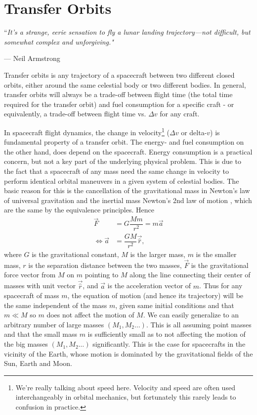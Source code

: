 \chapter{Transfer Orbits} \label{ch:transfer orbits}
\epigraph{``\itshape{It's a strange, eerie sensation to fly a lunar landing trajectory—not difficult, but somewhat complex and unforgiving.}"}{--- \textup{Neil Armstrong}}
Transfer orbits is any trajectory of a spacecraft between two different closed orbits, either around the same celestial body or two different bodies. In general, transfer orbits will always be a trade-off between flight time (the total time required for the transfer orbit) and fuel consumption for a specific craft - or equivalently, a trade-off between flight time vs. $\Delta v$ for any craft.

In spacecraft flight dynamics, the change in velocity\footnote{We're really talking about speed here. Velocity and speed are often used interchangeably in orbital mechanics, but fortunately this rarely leads to confusion in practice.} ($\Delta v$ or delta-$v$) is fundamental property of a transfer orbit. The energy- and fuel consumption on the other hand, does depend on the spacecraft. Energy consumption is a practical concern, but not a key part of the underlying physical problem. This is due to the fact that a spacecraft of any mass need the same change in velocity to perform identical orbital maneuvers in a given system of celestial bodies. The basic reason for this is the cancellation of the gravitational mass in Newton's law of universal gravitation and the inertial mass Newton's 2nd law of motion \cite{Knudsen2002}, which are the same by the equivalence principles. Hence
\begin{align}
\vec{F} &= G \dfrac{M m}{r^2} = m \vec{a} \\[0.3cm]
\Leftrightarrow \vec{a} &= \dfrac{G M}{r^2} \vec{\hat{r}} \label{eq:general-eom},
\end{align}
where $G$ is the gravitational constant, $M$ is the larger mass, $m$ is the smaller mass, $r$ is the separation distance between the two masses, $\vec{F}$ is the gravitational force vector from $M$ on $m$ pointing to $M$ along the line connecting their center of masses with unit vector $\vec{\hat{r}}$, and $\vec{a}$ is the acceleration vector of $m$. Thus for any spacecraft of mass $m$, the equation of motion (and hence its trajectory) will be the same independent of the mass $m$, given same initial conditions and that $m \ll M$ so $m$ does not affect the motion of $M$. We can easily generalize to an arbitrary number of large masses $(M_1, M_2 \dots)$. This is all assuming point masses and that the small mass $m$ is sufficiently small as to not affecting the motion of the big masses $(M_1, M_2 \dots)$ significantly. This is the case for spacecrafts in the vicinity of the Earth, whose motion is dominated by the gravitational fields of the Sun, Earth and Moon.

